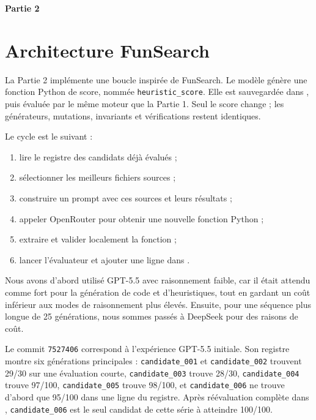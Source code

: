 \documentclass[11pt,a4paper]{article}
\begin{document}
\clearpage
\begin{center}
  {\LARGE\bfseries Partie 2}
\end{center}
\vspace{0.6em}

\section{Architecture FunSearch}

La Partie 2 implémente une boucle inspirée de FunSearch. Le modèle génère une fonction Python de score, nommée \texttt{heuristic\_score}. Elle est sauvegardée dans , puis évaluée par le même moteur que la Partie 1. Seul le score change ; les générateurs, mutations, invariants et vérifications restent identiques.

Le cycle est le suivant :
\begin{enumerate}
  \item lire le registre des candidats déjà évalués ;
  \item sélectionner les meilleurs fichiers sources ;
  \item construire un prompt avec ces sources et leurs résultats ;
  \item appeler OpenRouter pour obtenir une nouvelle fonction Python ;
  \item extraire et valider localement la fonction ;
  \item lancer l'évaluateur et ajouter une ligne dans .
\end{enumerate}

Nous avons d'abord utilisé GPT-5.5 avec raisonnement faible, car il était attendu comme fort pour la génération de code et d'heuristiques, tout en gardant un coût inférieur aux modes de raisonnement plus élevés. Ensuite, pour une séquence plus longue de 25 générations, nous sommes passés à DeepSeek pour des raisons de coût.

Le commit \texttt{7527406} correspond à l'expérience GPT-5.5 initiale. Son registre montre six générations principales : \texttt{candidate\_001} et \texttt{candidate\_002} trouvent 29/30 sur une évaluation courte, \texttt{candidate\_003} trouve 28/30, \texttt{candidate\_004} trouve 97/100, \texttt{candidate\_005} trouve 98/100, et \texttt{candidate\_006} ne trouve d'abord que 95/100 dans une ligne du registre. Après réévaluation complète dans , \texttt{candidate\_006} est le seul candidat de cette série à atteindre 100/100.
\end{document}
